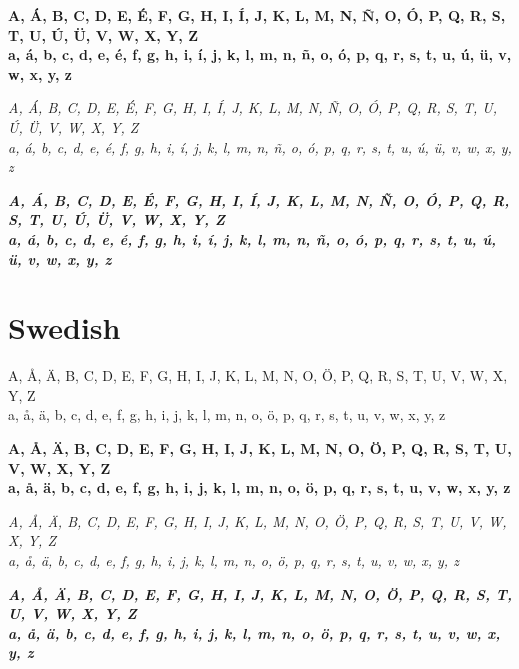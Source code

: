 \documentclass[12pt]{article}
\begin{document}
\textbf{
A, Á, B, C, D, E, É, F, G, H, I, Í, J, K, L, M, N, Ñ, O, Ó, P, Q, R, S, T, U, Ú, Ü, V, W, X, Y, Z \\
a, á, b, c, d, e, é, f, g, h, i, í, j, k, l, m, n, ñ, o, ó, p, q, r, s, t, u, ú, ü, v, w, x, y, z
}

\textit{
A, Á, B, C, D, E, É, F, G, H, I, Í, J, K, L, M, N, Ñ, O, Ó, P, Q, R, S, T, U, Ú, Ü, V, W, X, Y, Z \\
a, á, b, c, d, e, é, f, g, h, i, í, j, k, l, m, n, ñ, o, ó, p, q, r, s, t, u, ú, ü, v, w, x, y, z
}

\textbf{\textit{
A, Á, B, C, D, E, É, F, G, H, I, Í, J, K, L, M, N, Ñ, O, Ó, P, Q, R, S, T, U, Ú, Ü, V, W, X, Y, Z \\
a, á, b, c, d, e, é, f, g, h, i, í, j, k, l, m, n, ñ, o, ó, p, q, r, s, t, u, ú, ü, v, w, x, y, z
}}


\clearpage
\section{Swedish}
A, Å, Ä, B, C, D, E, F, G, H, I, J, K, L, M, N, O, Ö, P, Q, R, S, T, U, V, W, X, Y, Z \\
a, å, ä, b, c, d, e, f, g, h, i, j, k, l, m, n, o, ö, p, q, r, s, t, u, v, w, x, y, z

\textbf{
A, Å, Ä, B, C, D, E, F, G, H, I, J, K, L, M, N, O, Ö, P, Q, R, S, T, U, V, W, X, Y, Z \\
a, å, ä, b, c, d, e, f, g, h, i, j, k, l, m, n, o, ö, p, q, r, s, t, u, v, w, x, y, z
}

\textit{
A, Å, Ä, B, C, D, E, F, G, H, I, J, K, L, M, N, O, Ö, P, Q, R, S, T, U, V, W, X, Y, Z \\
a, å, ä, b, c, d, e, f, g, h, i, j, k, l, m, n, o, ö, p, q, r, s, t, u, v, w, x, y, z
}

\textbf{\textit{
A, Å, Ä, B, C, D, E, F, G, H, I, J, K, L, M, N, O, Ö, P, Q, R, S, T, U, V, W, X, Y, Z \\
a, å, ä, b, c, d, e, f, g, h, i, j, k, l, m, n, o, ö, p, q, r, s, t, u, v, w, x, y, z
}}
\end{document}
